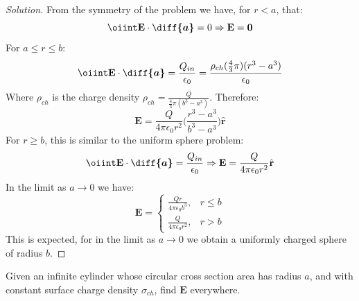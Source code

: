 \documentclass[crop=false,class=article,oneside]{standalone}
\begin{document}
        \begin{proof}[Solution]
            From the symmetry of the problem we have, for $r<a$, that:
            \begin{equation*}
                \oiint\mathbf{E}\cdot\boldsymbol{\diff{a}}
                =0\Rightarrow\mathbf{E}=\mathbf{0}
            \end{equation*}
            For $a\leq{r}\leq{b}$:
            \begin{equation*}
                \oiint\mathbf{E}\cdot\boldsymbol{\diff{a}}
                =\frac{Q_{in}}{\epsilon_{0}}
                =\frac{\rho_{ch}(\frac{4}{3}\pi)(r^{3}-a^{3})}
                      {\epsilon_0}    
            \end{equation*}
            Where $\rho_{ch}$ is the charge density
            $\rho_{ch}=\frac{Q}{\frac{4}{3}\pi(b^{3}-a^{3})}$.
            Therefore:
            \begin{equation*}
                \mathbf{E}
                =\frac{Q}{4\pi\epsilon_{0}r^{2}}
                \bigg(\frac{r^{3}-a^{3}}{b^{3}-a^{3}}\bigg)
                \hat{\mathbf{r}}
            \end{equation*}
            For $r\geq b$, this is similar to
            the uniform sphere problem:
            \begin{equation*}
                \oiint\mathbf{E}\cdot\boldsymbol{\diff{a}}
                =\frac{Q_{in}}{\epsilon_{0}}
                \Rightarrow\mathbf{E}
                =\frac{Q}{4\pi\epsilon_{0}r^{2}}\hat{\mathbf{r}}
            \end{equation*}
            In the limit as $a\rightarrow{0}$ we have:
            \begin{equation*}
                \mathbf{E}=
                \begin{cases}
                    \frac{Qr}{4\pi\epsilon_{0}b^{3}},&r\leq b\\
                    \frac{Q}{4\pi\epsilon_{0}r^{2}},&r>b
                \end{cases}
            \end{equation*}
            This is expected, for in the limit as
            $a\rightarrow 0$ we obtain a uniformly
            charged sphere of radius $b$.
        \end{proof}
        \begin{problem}[Wangsness 4-7]
            Given an infinite cylinder whose circular
            cross section area has radius $a$, and with
            constant surface charge density $\sigma_{ch}$,
            find $\mathbf{E}$ everywhere.
        \end{problem}
\end{document}
